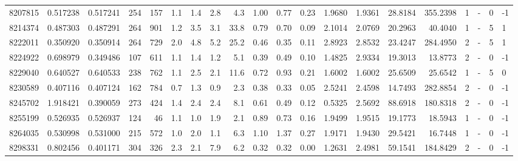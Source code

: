 \begin{tabular}{rrrrrrrrrrrrrrrrrlrl}
   8207815 & 0.517238 &   0.517241 &  254 &  157 &      1.1 &      1.4 &     2.8 &      4.3 &       1.00 &        0.77 &        0.23 &  1.9680 &  1.9361 &   28.8184 &  355.2398 &       1 &             - &        0 &        -1 \\
   8214374 & 0.487303 &   0.487291 &  264 &  901 &      1.2 &      3.5 &     3.1 &     33.8 &       0.79 &        0.70 &        0.09 &  2.1014 &  2.0769 &   20.2963 &   40.4040 &       1 &             - &        5 &         1 \\
   8222011 & 0.350920 &   0.350914 &  264 &  729 &      2.0 &      4.8 &     5.2 &     25.2 &       0.46 &        0.35 &        0.11 &  2.8923 &  2.8532 &   23.4247 &  284.4950 &       2 &             - &        5 &         1 \\
   8224922 & 0.698979 &   0.349486 &  107 &  611 &      1.1 &      1.4 &     1.2 &      5.1 &       0.39 &        0.49 &        0.10 &  1.4825 &  2.9334 &   19.3013 &   13.8773 &       2 &             - &        0 &        -1 \\
   8229040 & 0.640527 &   0.640533 &  238 &  762 &      1.1 &      2.5 &     2.1 &     11.6 &       0.72 &        0.93 &        0.21 &  1.6002 &  1.6002 &   25.6509 &   25.6542 &       1 &             - &        5 &         0 \\
   8230589 & 0.407116 &   0.407124 &  162 &  784 &      0.7 &      1.3 &     0.9 &      2.3 &       0.38 &        0.33 &        0.05 &  2.5241 &  2.4598 &   14.7493 &  282.8854 &       2 &             - &        0 &        -1 \\
   8245702 & 1.918421 &   0.390059 &  273 &  424 &      1.4 &      2.4 &     2.4 &      8.1 &       0.61 &        0.49 &        0.12 &  0.5325 &  2.5692 &   88.6918 &  180.8318 &       2 &             - &        0 &        -1 \\
   8255199 & 0.526935 &   0.526937 &  124 &   46 &      1.1 &      1.0 &     1.9 &      2.1 &       0.89 &        0.73 &        0.16 &  1.9499 &  1.9515 &   19.1773 &   18.5943 &       1 &             - &        0 &        -1 \\
   8264035 & 0.530998 &   0.531000 &  215 &  572 &      1.0 &      2.0 &     1.1 &      6.3 &       1.10 &        1.37 &        0.27 &  1.9171 &  1.9430 &   29.5421 &   16.7448 &       1 &             - &        0 &        -1 \\
   8298331 & 0.802456 &   0.401171 &  304 &  326 &      2.3 &      2.1 &     7.9 &      6.2 &       0.32 &        0.32 &        0.00 &  1.2631 &  2.4981 &   59.1541 &  184.8429 &       2 &             - &        0 &        -1 \\

\end{tabular}

